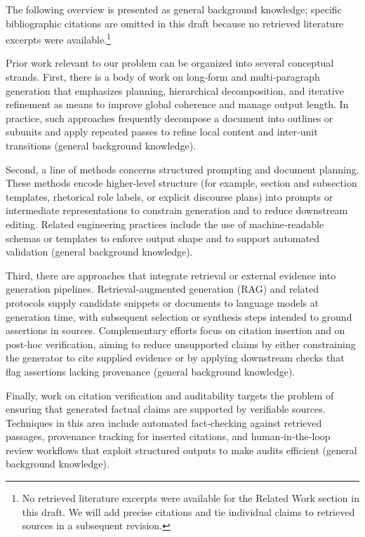 The following overview is presented as general background knowledge; specific bibliographic citations are omitted in this draft because no retrieved literature excerpts were available.\footnote{No retrieved literature excerpts were available for the Related Work section in this draft. We will add precise citations and tie individual claims to retrieved sources in a subsequent revision.}

Prior work relevant to our problem can be organized into several conceptual strands. First, there is a body of work on long‑form and multi‑paragraph generation that emphasizes planning, hierarchical decomposition, and iterative refinement as means to improve global coherence and manage output length. In practice, such approaches frequently decompose a document into outlines or subunits and apply repeated passes to refine local content and inter‑unit transitions (general background knowledge).

Second, a line of methods concerns structured prompting and document planning. These methods encode higher‑level structure (for example, section and subsection templates, rhetorical role labels, or explicit discourse plans) into prompts or intermediate representations to constrain generation and to reduce downstream editing. Related engineering practices include the use of machine‑readable schemas or templates to enforce output shape and to support automated validation (general background knowledge).

Third, there are approaches that integrate retrieval or external evidence into generation pipelines. Retrieval‑augmented generation (RAG) and related protocols supply candidate snippets or documents to language models at generation time, with subsequent selection or synthesis steps intended to ground assertions in sources. Complementary efforts focus on citation insertion and on post‑hoc verification, aiming to reduce unsupported claims by either constraining the generator to cite supplied evidence or by applying downstream checks that flag assertions lacking provenance (general background knowledge).

Finally, work on citation verification and auditability targets the problem of ensuring that generated factual claims are supported by verifiable sources. Techniques in this area include automated fact‑checking against retrieved passages, provenance tracking for inserted citations, and human‑in‑the‑loop review workflows that exploit structured outputs to make audits efficient (general background knowledge).

